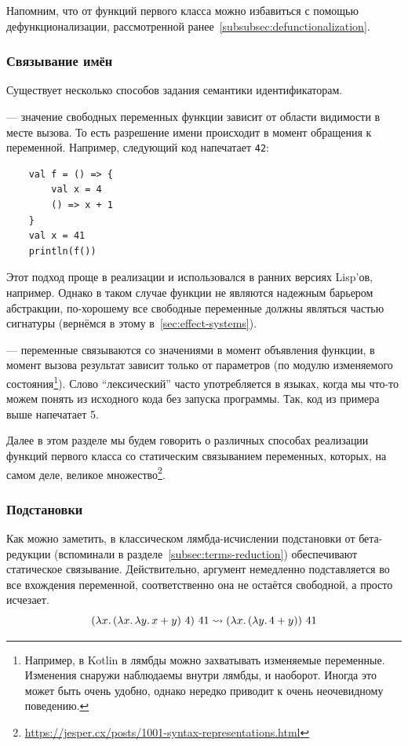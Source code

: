 Напомним, что от функций первого класса можно избавиться с помощью дефункционализации, рассмотренной ранее~\ref{subsubsec:defunctionalization}.

\subsubsection{Связывание имён} \label{subsubsec:name-bindings}

Существует несколько способов задания семантики идентификаторам.

 --- значение свободных переменных функции зависит от области видимости в месте вызова.
То есть разрешение имени происходит в момент обращения к переменной.
Например, следующий код напечатает \texttt{42}:
\begin{verbatim}
    val f = () => {
        val x = 4
        () => x + 1
    }
    val x = 41
    println(f())
\end{verbatim}

Этот подход проще в реализации и использовался в ранних версиях Lisp'ов, например.
Однако в таком случае функции не являются надежным барьером абстракции, по-хорошему все свободные переменные должны являться частью сигнатуры (вернёмся в этому в~\ref{sec:effect-systems}).

 --- переменные связываются со значениями в момент объявления функции, в момент вызова результат зависит только от параметров (по модулю изменяемого состояния\footnote{Например, в Kotlin в лямбды можно захватывать изменяемые переменные. Изменения снаружи наблюдаемы внутри лямбды, и наоборот. Иногда это может быть очень удобно, однако нередко приводит к очень неочевидному поведению.}).
Слово ``лексический'' часто употребляется в языках, когда мы что-то можем понять из исходного кода без запуска программы.
Так, код из примера выше напечатает 5.

Далее в этом разделе мы будем говорить о различных способах реализации функций первого класса со статическим связыванием переменных, которых, на самом деле, великое множество\footnote{\url{https://jesper.cx/posts/1001-syntax-representations.html}}.

\subsubsection{Подстановки} \label{subsubsec:substitutions}

Как можно заметить, в классическом лямбда-исчислении подстановки от бета-редукции (вспоминали в разделе~\ref{subsec:terms-reduction}) обеспечивают статическое связывание.
Действительно, аргумент немедленно подставляется во все вхождения переменной, соответственно она не остаётся свободной, а просто исчезает.
\[
    (\lambda x\ldotp (\lambda x\ldotp \lambda y\ldotp x + y) ~ 4) ~ 41 \rightsquigarrow (\lambda x\ldotp (\lambda y\ldotp 4 + y)) ~ 41
\]

